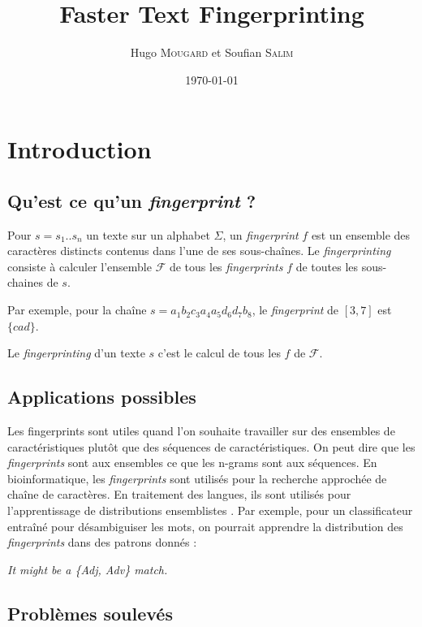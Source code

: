 \documentclass[a4paper]{article}
\title{Faster Text Fingerprinting}
\author{Hugo \textsc{Mougard} et Soufian \textsc{Salim}}
\date{\today}
\begin{document}
\maketitle

\section{Introduction}

\subsection{Qu'est ce qu'un \emph{fingerprint} ?}

Pour $s = s_{1} .. s_{n}$ un texte sur un alphabet $\Sigma$, un \textit{fingerprint} $f$ est un ensemble des caractères distincts contenus dans l'une de ses sous-chaînes. Le \emph{fingerprinting} consiste à calculer l'ensemble $\mathcal{F}$ de tous les \emph{fingerprints} $f$ de toutes les sous-chaines de $s$.  \newline

Par exemple, pour la chaîne $s = a_{1} b_{2} c_{3} a_{4} a_{5} d_{6} d_{7} b_{8}$, le \emph{fingerprint} de $[3,7]$ est $\{cad\}$. \newline

Le \emph{fingerprinting} d'un texte $s$ c'est le calcul de tous les $f$ de $\mathcal{F}$.

\subsection{Applications possibles}

Les fingerprints sont utiles quand l'on souhaite travailler sur des ensembles de caractéristiques plutôt que des séquences de caractéristiques. On peut dire que les \emph{fingerprints} sont aux ensembles ce que les n-grams sont aux séquences. En bioinformatique, les \emph{fingerprints} sont utilisés pour la recherche approchée de chaîne de caractères. En traitement des langues, ils sont utilisés pour l'apprentissage de distributions ensemblistes \cite{amir}. Par exemple, pour un classificateur entraîné pour désambiguiser les mots, on pourrait apprendre la distribution des \emph{fingerprints} dans des patrons donnés : \newline

\emph{It might be a \{Adj, Adv\} match.}

\subsection{Problèmes soulevés}
\end{document}
